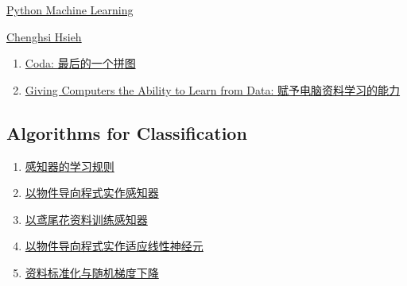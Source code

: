 \documentclass[11pt]{article}
\begin{document}
	\kaishu 
	\setcounter{section}{0}
	\begin{center}
		{\LARGE  \href{https://www.youtube.com/playlist?list=PL8xPPUJdubH7jx4wkkX1rvEcp5hmmK-co}{Python Machine Learning}}
		
		
		{\large \href{https://fin.ntub.edu.tw/p/412-1037-121.php?Lang=en}{Chenghsi Hsieh}}
	\end{center}
\setcounter{page}{1}



\vspace{-0.25cm}

\begin{enumerate}
	\item \href{https://mp.weixin.qq.com/s/NWZfDX6aIm7hlAq3qYhBTg}{Coda: 最后的一个拼图}	%
	\item \href{https://mp.weixin.qq.com/s/kl1LJvakcBHbcx2ESK9JjQ}{Giving Computers the Ability to Learn from Data: 赋予电脑资料学习的能力}	%
\end{enumerate}

\subsection*{Algorithms for Classification}

\vspace{-0.25cm}

\begin{multicols}{2}
	\begin{enumerate}
		\item \href{https://mp.weixin.qq.com/s/pe9jrh_56vtKjIRZO2t4cw}{感知器的学习规则}	%
		\item \href{https://mp.weixin.qq.com/s/X2JVorzkJ1VZkEee4cS7EQ}{以物件导向程式实作感知器}	%
		\item \href{https://mp.weixin.qq.com/s/NjhyB5pvhdpAI6c_9vMRCw}{以鸢尾花资料训练感知器}	%
		\item \href{https://mp.weixin.qq.com/s/SUat1DedwYHNe6Nh77aTMg}{以物件导向程式实作适应线性神经元}	%
		\item \href{https://mp.weixin.qq.com/s/S6YvTFY8EUe7zkwymj5Yaw}{资料标准化与随机梯度下降}	%
	\end{enumerate}
\end{multicols}
\end{document}
